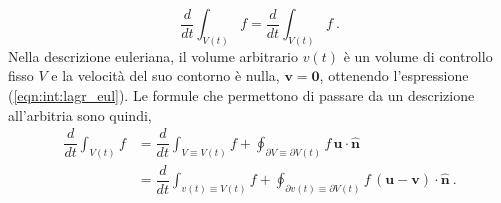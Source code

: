 \begin{equation}
    \dfrac{d}{dt} \int_{V(t)} f = \dfrac{d}{dt} \int_{V(t)} f \ .
\end{equation}
Nella descrizione euleriana, il volume arbitrario $v(t)$ è un volume di controllo fisso $V$ e la velocità del suo contorno è nulla, $\bm{v} = \bm{0}$, ottenendo l'espressione (\ref{eqn:int:lagr_eul}).
Le formule che permettono di passare da un descrizione all'arbitria sono quindi,
\begin{equation}
\begin{aligned}
    \dfrac{d}{dt} \int_{V(t)} f & = \dfrac{d}{dt} \int_{V \equiv V(t)} f +
     \oint_{\partial V\equiv \partial V(t)} f \, \bm{u} \cdot \bm{\hat{n}} \\
     & = \dfrac{d}{dt} \int_{v(t) \equiv V(t)} f +
     \oint_{\partial v(t) \equiv \partial V(t)} f \, (\bm{u}-\bm{v}) \cdot \bm{\hat{n}} \ .
\end{aligned}
\end{equation}

% 
% 
% 
% 

